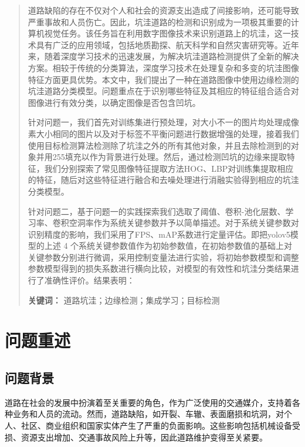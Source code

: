 \documentclass[a4paper, 10pt]{article}
\begin{document}
	\begin{abstract}
	
	道路缺陷的存在不仅对个人和社会的资源支出造成了间接影响，还可能导致严重事故和人员伤亡。因此，坑洼道路的检测和识别成为一项极其重要的计算机视觉任务。该任务旨在利用数字图像技术来识别道路上的坑洼，这一技术具有广泛的应用领域，包括地质勘探、航天科学和自然灾害研究等。近年来，随着深度学习技术的迅速发展，为解决坑洼道路检测提供了全新的解决方案。相较于传统的分类算法，深度学习技术在处理复杂和多变的坑洼图像特征方面更具优势。本文中，我们提出了一种在道路图像中使用边缘检测的坑洼道路分类模型。问题重点在于识别哪些特征及其相应的特征组合适合对图像进行有效分类，以确定图像是否包含凹坑。
	
	针对问题一，我们首先对训练集进行预处理，对大小不一的图片均处理成像素大小相同的图片以及对于标签不平衡问题进行数据增强的处理，接着我们使用目标检测算法检测除了坑洼之外的所有其他对象，并且去除检测到的对象并用255填充以作为背景进行处理。然后，通过检测凹坑的边缘来提取特征，我们分别探索了常见图像特征提取方法HOG、LBP对训练集提取相应的特征，随后对这些特征进行融合和去噪处理进行消融实验得到相应的坑洼分类模型。
	
	针对问题二，基于问题一的实践探索我们选取了阈值、卷积-池化层数、学习率、卷积空洞率作为系统关键参数并予以简单描述。对于系统关键参数对识别精度的影响，我们采用了FPS、mAP系数进行定量评估。即把yolov5模型的上述 4 个系统关键参数值作为初始参数值，在初始参数值的基础上对关键参数分别进行微调，采用控制变量法进行实验，将初始参数模型和调整参数模型得到的损失系数进行横向比较，对模型的有效性和坑洼分类结果进行了准确性评价。结果表明：
		
		
		\noindent
		\textbf{关键词：} 道路坑洼；边缘检测；集成学习；目标检测
	\end{abstract}
	
	
	\clearpage
	\tableofcontents
	
	\clearpage
	
	\section{问题重述}
	
	\subsection{问题背景}
	
	道路在社会的发展中扮演着至关重要的角色，作为广泛使用的交通媒介，支持着各种业务和人员的流动。然而，道路缺陷，如开裂、车辙、表面磨损和坑洞，对个人、社区、商业组织和国家实体产生了严重的负面影响。这些影响包括机械设备受损、资源支出增加、交通事故风险上升等，因此道路维护变得至关紧要。
	
\end{document}

